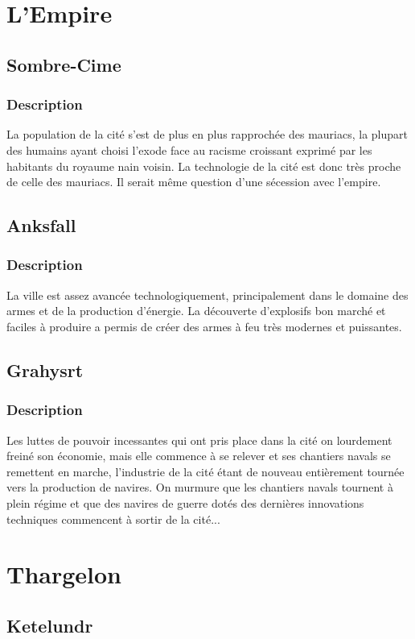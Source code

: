 \section{L'Empire}
\subsection{Sombre-Cime}
\subsubsection{Description}
La population de la cité s'est de plus en plus rapprochée des mauriacs, la plupart des humains ayant choisi l'exode face au racisme croissant exprimé par les habitants du royaume nain voisin. La technologie de la cité est donc très proche de celle des mauriacs. Il serait même question d'une sécession avec l'empire.
\subsection{Anksfall}
\subsubsection{Description}
La ville est assez avancée technologiquement, principalement dans le domaine des armes et de la production d'énergie. La découverte d'explosifs bon marché et faciles à produire a permis de créer des armes à feu très modernes et puissantes.
\subsection{Grahysrt}
\subsubsection{Description}
Les luttes de pouvoir incessantes qui ont pris place dans la cité on lourdement freiné son économie, mais elle commence à se relever et ses chantiers navals se remettent en marche, l'industrie de la cité étant de nouveau entièrement tournée vers la production de navires. On murmure que les chantiers navals tournent à plein régime et que des navires de guerre dotés des dernières innovations techniques commencent à sortir de la cité...
\section{Thargelon}
\subsection{Ketelundr}
